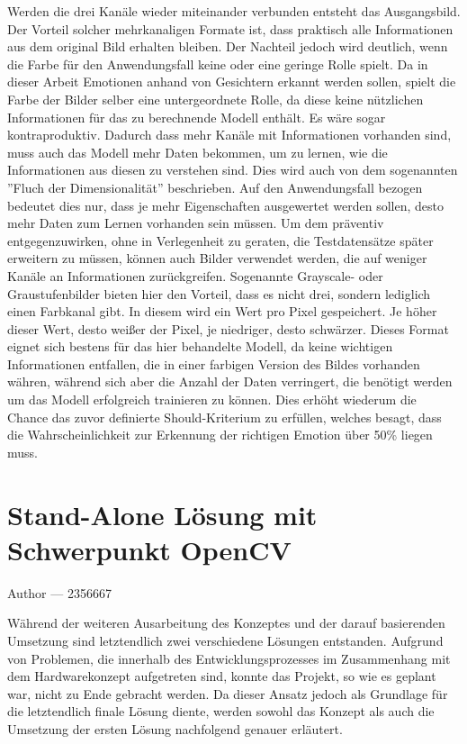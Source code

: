\documentclass[12pt, a4paper]{report}
\makeatletter
\newcommand{\chapterauthor}[1]{%
  {\parindent0pt\vspace*{-25pt}%
  \large{Author --- }
  \linespread{1.1}\large\scshape#1%
  \par\nobreak\vspace*{35pt} }
  \@afterheading%
}
\makeatother
\begin{document}
Werden die drei Kanäle wieder miteinander verbunden entsteht das Ausgangsbild. Der Vorteil solcher mehrkanaligen Formate ist, dass praktisch alle Informationen aus dem original Bild erhalten bleiben. Der Nachteil jedoch wird deutlich, wenn die Farbe für den Anwendungsfall keine oder eine geringe Rolle spielt. Da in dieser Arbeit Emotionen anhand von Gesichtern erkannt werden sollen, spielt die Farbe der Bilder selber eine untergeordnete Rolle, da diese keine nützlichen Informationen für das zu berechnende Modell enthält. Es wäre sogar kontraproduktiv. Dadurch dass mehr Kanäle mit Informationen vorhanden sind, muss auch das Modell mehr Daten bekommen, um zu lernen, wie die Informationen aus diesen zu verstehen sind. Dies wird auch von dem sogenannten ''Fluch der Dimensionalität'' beschrieben. Auf den Anwendungsfall bezogen bedeutet dies nur, dass je mehr Eigenschaften ausgewertet werden sollen, desto mehr Daten zum Lernen vorhanden sein müssen. Um dem präventiv entgegenzuwirken, ohne in Verlegenheit zu geraten, die Testdatensätze später erweitern zu müssen, können auch Bilder verwendet werden, die auf weniger Kanäle an Informationen zurückgreifen. Sogenannte Grayscale- oder Graustufenbilder bieten hier den Vorteil, dass es nicht drei, sondern lediglich einen Farbkanal gibt. In diesem wird ein Wert pro Pixel gespeichert. Je höher dieser Wert, desto weißer der Pixel, je niedriger, desto schwärzer. Dieses Format eignet sich bestens für das hier behandelte Modell, da keine wichtigen Informationen entfallen, die in einer farbigen Version des Bildes vorhanden währen, während sich aber die Anzahl der Daten verringert, die benötigt werden um das Modell erfolgreich trainieren zu können. Dies erhöht wiederum die Chance das zuvor definierte Should-Kriterium zu erfüllen, welches besagt, dass die Wahrscheinlichkeit zur Erkennung der richtigen Emotion über 50\% liegen muss. 

\let\cleardoublepage\relax

\chapter{Stand-Alone Lösung mit Schwerpunkt OpenCV}
\chapterauthor{2356667}
Während der weiteren Ausarbeitung des Konzeptes und der darauf basierenden Umsetzung sind letztendlich zwei verschiedene Lösungen entstanden. Aufgrund von Problemen, die innerhalb des Entwicklungsprozesses im Zusammenhang mit dem Hardwarekonzept aufgetreten sind, konnte das Projekt, so wie es geplant war, nicht zu Ende gebracht werden. Da dieser Ansatz jedoch als Grundlage für die letztendlich finale Lösung diente, werden sowohl das Konzept als auch die Umsetzung der ersten Lösung nachfolgend genauer erläutert.
\end{document}
